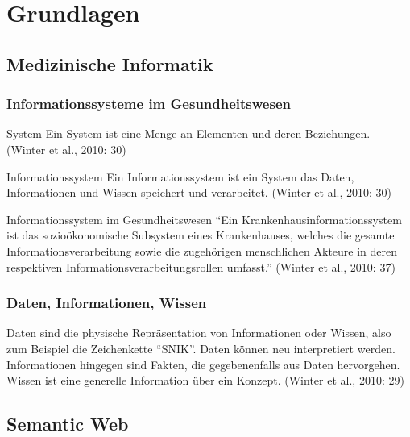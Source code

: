 
\chapter{Grundlagen}\label{ch:preliminaries}

\section{Medizinische Informatik}

\subsection{Informationssysteme im Gesundheitswesen}

\begin{definition}{System}
Ein System ist eine Menge an Elementen und deren Beziehungen. (Winter et al., 2010: 30)
\end{definition}

\begin{definition}{Informationssystem}
Ein Informationssystem ist ein System das Daten, Informationen und Wissen speichert und verarbeitet. (Winter et al., 2010: 30)
\end{definition}

\begin{definition}{Informationssystem im Gesundheitswesen}
\enquote{Ein Krankenhausinformationssystem ist das sozioökonomische Subsystem eines Krankenhauses, welches die gesamte Informationsverarbeitung sowie die zugehörigen menschlichen Akteure in deren respektiven Informationsverarbeitungsrollen umfasst.} (Winter et al., 2010: 37)
\end{definition}

\subsection{Daten, Informationen, Wissen}
Daten sind die physische Repräsentation von Informationen oder Wissen, also zum Beispiel die Zeichenkette \enquote{SNIK}. Daten können neu interpretiert werden.
Informationen hingegen sind Fakten, die gegebenenfalls aus Daten hervorgehen.
Wissen ist eine generelle Information über ein Konzept. (Winter et al., 2010: 29)

\section{Semantic Web}

